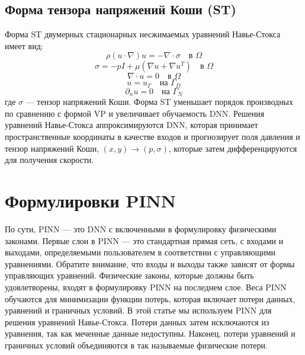 \documentclass[a4paper,12pt]{article}
\theoremstyle{plain} %
\theoremstyle{definition} %
\theoremstyle{remark} %
\begin{document}
\subsection{Форма тензора напряжений Коши (ST)}

Форма ST двумерных стационарных несжимаемых уравнений Навье-Стокса имеет вид:
\begin{equation}
\rho (u \cdot \nabla) u = -\nabla \cdot \sigma \quad \text{в } \Omega
\end{equation}
\[
\sigma = -pI + \mu (\nabla u + \nabla u^T) \quad \text{в } \Omega
\]
\[
\nabla \cdot u = 0 \quad \text{в } \Omega
\]
\[
u = u_\Gamma \quad \text{на } \Gamma_D
\]
\[
\partial_n u = 0 \quad \text{на } \Gamma_N
\]
где $\sigma$ — тензор напряжений Коши. Форма ST уменьшает порядок производных по сравнению с формой VP и увеличивает обучаемость DNN. Решения уравнений Навье-Стокса аппроксимируются DNN, которая принимает пространственные координаты в качестве входов и прогнозирует поля давления и тензор напряжений Коши, $(x, y) \rightarrow (p, \sigma)$, которые затем дифференцируются для получения скорости.

\section{Формулировки PINN}

По сути, PINN — это DNN с включенными в формулировку физическими законами. Первые слои в PINN — это стандартная прямая сеть, с входами и выходами, определяемыми пользователем в соответствии с управляющими уравнениями. Обратите внимание, что входы и выходы также зависят от формы управляющих уравнений. Физические законы, которые должны быть удовлетворены, входят в формулировку PINN на последнем слое. Веса PINN обучаются для минимизации функции потерь, которая включает потери данных, уравнений и граничных условий. В этой статье мы используем PINN для решения уравнений Навье-Стокса. Потери данных затем исключаются из уравнения, так как меченные данные недоступны. Наконец, потери уравнений и граничных условий объединяются в так называемые физические потери.
\end{document}
